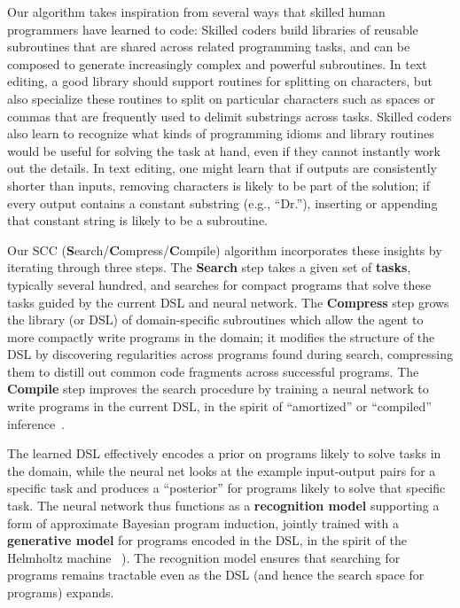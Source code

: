 \documentclass{article}
\newcommand{\system}{\textsc{SCC} }
\begin{document}
Our algorithm takes inspiration from several ways that skilled human
programmers have learned to code: Skilled coders build libraries of
reusable subroutines that are shared across related programming tasks,
and can be composed to generate increasingly complex and powerful
subroutines.  In text editing, a good library should support routines
for splitting on characters, but also specialize these routines to
split on particular characters such as spaces or commas that are
frequently used to delimit substrings across tasks.  Skilled coders
also learn to recognize what kinds of programming idioms and library
routines would be useful for solving the task at hand, even if they
cannot instantly work out the details.  In text editing, one might
learn that if outputs are consistently shorter than inputs, removing
characters is likely to be part of the solution; if every output
contains a constant substring (e.g., ``Dr.''), inserting or appending
that constant string is likely to be a subroutine.

Our \system (\textbf{S}earch/\textbf{C}ompress/\textbf{C}ompile)
algorithm incorporates these insights by iterating through three steps. 
The \textbf{Search} step takes a given set of \textbf{tasks}, typically
several hundred, and searches for compact programs that solve these tasks
guided by the current DSL and neural network.
The \textbf{Compress} step grows the library (or DSL) of
domain-specific subroutines which allow the agent to more compactly
write programs in the domain; it modifies the structure of the DSL by
discovering regularities across programs found during search, compressing
them to distill out common code fragments across successful programs.
The \textbf{Compile} step improves the search procedure by training a neural network to
write programs in the current DSL, in the spirit of ``amortized'' or
``compiled'' inference~\cite{le2016inference}.%

The learned DSL effectively encodes a prior on programs likely to
solve tasks in the domain, while the neural net looks at the example
input-output pairs for a specific task and produces a ``posterior''
for programs likely to solve that specific task.  The neural network
thus functions as a \textbf{recognition model} supporting a form of
approximate Bayesian program induction, jointly trained with a
\textbf{generative model} for programs encoded in the DSL, in the
spirit of the Helmholtz machine ~\cite{hinton1995wake}). The
recognition model ensures that searching for programs remains
tractable even as the DSL (and hence the search space for programs)
expands.
\end{document}

